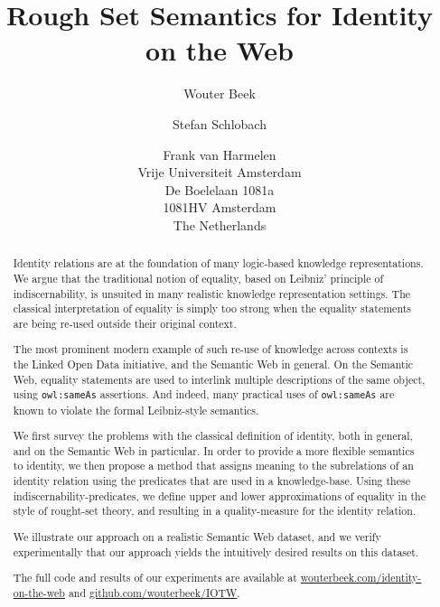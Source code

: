 \documentclass[letterpaper]{article}
\author{
  Wouter Beek \and Stefan Schlobach \and Frank van Harmelen\\
  Vrije Universiteit Amsterdam\\
  De Boelelaan 1081a\\
  1081HV Amsterdam\\
  The Netherlands
}
\title{Rough Set Semantics for Identity on the Web}
\newcommand{\URL}[1]{{\small \url{#1}}}
\begin{document}
\maketitle
\begin{abstract}
Identity relations are at the foundation of many logic-based knowledge representations.
We argue that the traditional notion of equality, based on Leibniz' principle of indiscernability,
is unsuited in many realistic knowledge representation settings. The classical  interpretation of equality
is simply too strong when the equality statements are being re-used outside their original context. 

The most prominent modern example of such re-use of knowledge across contexts is the 
Linked Open Data initiative, and the Semantic Web in general. On the Semantic Web,
equality statements are used to interlink multiple descriptions of the same object, 
using \verb|owl:sameAs| assertions. And indeed, many practical uses 
of \verb|owl:sameAs| are known to violate the formal Leibniz-style semantics.

We first survey the problems with the classical definition of identity, both in general, 
and on the Semantic Web in particular. 
In order to provide a more flexible semantics to identity, 
we then propose a method that assigns meaning to the subrelations of
an identity relation using the predicates that are used in a knowledge-base.
Using these indiscernability-predicates, we define upper and lower approximations 
of equality in the style of rought-set theory, and resulting in a quality-measure for the identity relation. 

We illustrate our approach on a realistic Semantic Web dataset, and we
verify experimentally that our approach yields the intuitively desired
results on this dataset. 

The full code and results of our experiments are available at
\URL{wouterbeek.com/identity-on-the-web} and
\URL{github.com/wouterbeek/IOTW}.



\end{abstract}













%



\end{document}
